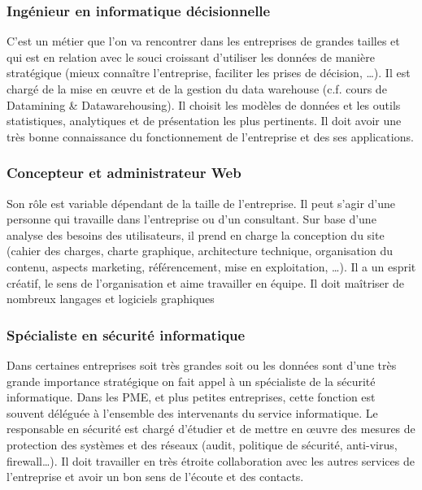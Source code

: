 \documentclass[10pt,a4paper,oneside,titlepage]{report}
\begin{document}
\subsubsection{Ingénieur en informatique décisionnelle}
C'est un métier que l’on va rencontrer dans les entreprises de grandes tailles
et qui est en relation avec le souci croissant d’utiliser les données de manière
stratégique (mieux connaître l’entreprise, faciliter les prises de décision,
\dots). Il est chargé de la mise en œuvre et de la gestion du data warehouse
(c.f. cours de Datamining \& Datawarehousing). Il choisit les modèles de données
et les outils statistiques, analytiques et de présentation les plus pertinents.
Il doit avoir une très bonne connaissance du fonctionnement de l’entreprise et
des ses applications.

\subsubsection{Concepteur et administrateur Web}
Son rôle est variable dépendant de la taille de l'entreprise. Il peut s'agir
d'une personne qui travaille dans l’entreprise ou d'un consultant. Sur base
d’une analyse des besoins des utilisateurs, il prend en charge la conception du
site (cahier des charges, charte graphique, architecture technique, organisation
du contenu, aspects marketing, référencement, mise en exploitation, \dots). Il a
un esprit créatif, le sens de l’organisation et aime travailler en équipe.
Il doit maîtriser de nombreux langages et logiciels graphiques

\subsubsection{Spécialiste en sécurité informatique}
Dans certaines entreprises soit très grandes soit ou les données sont d’une très
grande importance stratégique on fait appel à un spécialiste de la sécurité
informatique. Dans les PME, et plus petites entreprises, cette fonction est
souvent déléguée à l’ensemble des intervenants du service informatique.
Le responsable en sécurité est chargé d’étudier et de mettre en œuvre des
mesures de protection des systèmes et des réseaux (audit, politique de sécurité,
anti-virus, firewall\dots). Il doit travailler en très étroite collaboration
avec les autres services de l’entreprise et avoir un bon sens de l’écoute et des
contacts.
\end{document}
